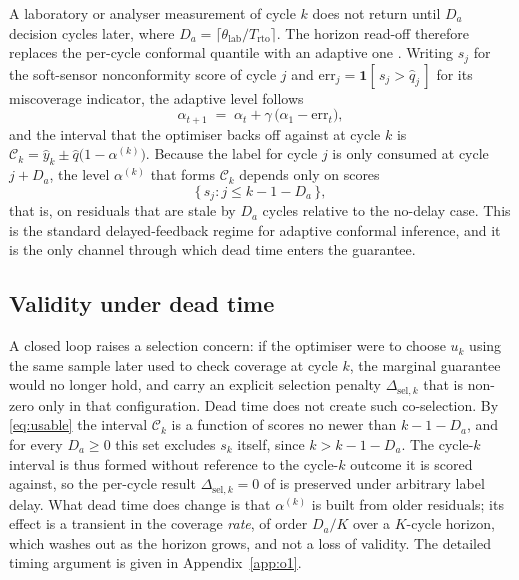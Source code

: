 A laboratory or analyser measurement of cycle $k$ does not return until $D_a$ decision cycles
later, where $D_a=\lceil \theta_{\mathrm{lab}}/T_{\mathrm{rto}}\rceil$. The horizon read-off
therefore replaces the per-cycle conformal quantile with an adaptive one
\citep{gibbs2021}. Writing $s_j$ for the soft-sensor nonconformity score of cycle $j$ and
$\mathrm{err}_j=\mathbf{1}[\,s_j>\hat q_j\,]$ for its miscoverage indicator, the adaptive level
follows
\begin{equation}
  \alpha_{t+1} \;=\; \alpha_t + \gamma\,\big(\alpha_1 - \mathrm{err}_{t}\big),
  \label{eq:aci}
\end{equation}
and the interval that the optimiser backs off against at cycle $k$ is
$\mathcal{C}_k=\hat y_k \pm \hat q\big(1-\alpha^{(k)}\big)$. Because the label for cycle $j$
is only consumed at cycle $j+D_a$, the level $\alpha^{(k)}$ that forms $\mathcal{C}_k$ depends
only on scores
\begin{equation}
  \{\, s_j : j \le k-1-D_a \,\},
  \label{eq:usable}
\end{equation}
that is, on residuals that are stale by $D_a$ cycles relative to the no-delay case. This is the
standard delayed-feedback regime for adaptive conformal inference, and it is the only channel
through which dead time enters the guarantee.

\subsection{Validity under dead time}
\label{sec:o1}

A closed loop raises a selection concern: if the optimiser were to choose $u_k$ using the same
sample later used to check coverage at cycle $k$, the marginal guarantee would no longer hold,
and \citet{busico_m4} carry an explicit selection penalty $\Delta_{\mathrm{sel},k}$ that is
non-zero only in that configuration. Dead time does not create such co-selection. By
\eqref{eq:usable} the interval $\mathcal{C}_k$ is a function of scores no newer than
$k-1-D_a$, and for every $D_a\ge 0$ this set excludes $s_k$ itself, since $k>k-1-D_a$. The
cycle-$k$ interval is thus formed without reference to the cycle-$k$ outcome it is scored
against, so the per-cycle result $\Delta_{\mathrm{sel},k}=0$ of \citet{busico_m4} is preserved
under arbitrary label delay. What dead time does change is that $\alpha^{(k)}$ is built from
older residuals; its effect is a transient in the coverage \emph{rate}, of order $D_a/K$ over a
$K$-cycle horizon, which washes out as the horizon grows, and not a loss of validity. The
detailed timing argument is given in Appendix~\ref{app:o1}.

